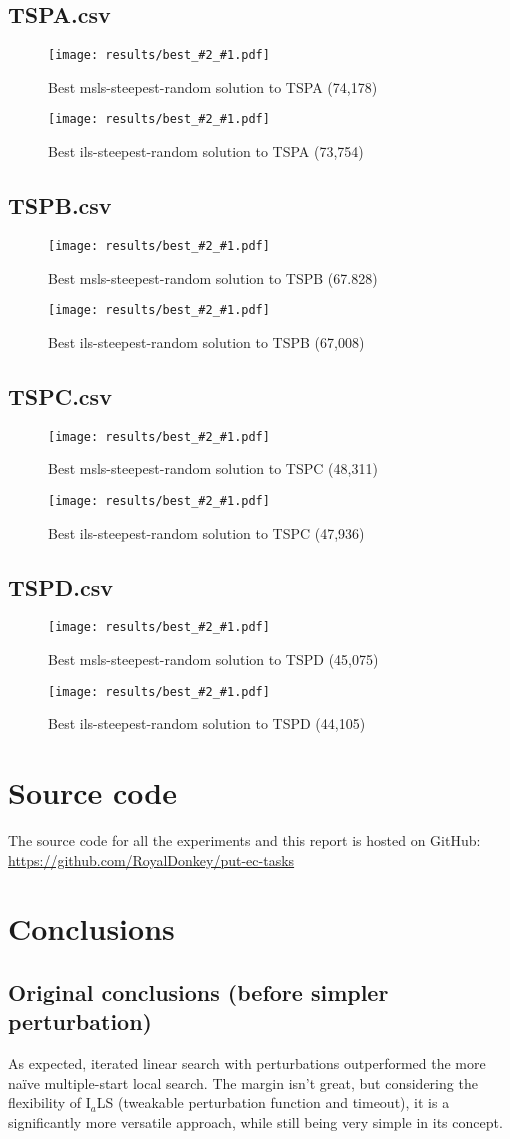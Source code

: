 \documentclass[14pt]{article}
\begin{document}
\newcommand{\visualization}[3]{%
\begin{figure}[H]%
	\texttt{[image: results/best\_\#2\_\#1.pdf]}%
	\vspace{-12mm}%
	\caption{Best #2 solution to #1 (#3)}%
\end{figure}%
}

\subsection{TSPA.csv}
\visualization{TSPA}{msls-steepest-random}{74,178}
\visualization{TSPA}{ils-steepest-random}{73,754}

\subsection{TSPB.csv}
\visualization{TSPB}{msls-steepest-random}{67.828}
\visualization{TSPB}{ils-steepest-random}{67,008}

\subsection{TSPC.csv}
\visualization{TSPC}{msls-steepest-random}{48,311}
\visualization{TSPC}{ils-steepest-random}{47,936}

\subsection{TSPD.csv}
\visualization{TSPD}{msls-steepest-random}{45,075}
\visualization{TSPD}{ils-steepest-random}{44,105}

\section{Source code}
The source code for all the experiments and this report is hosted on GitHub: \\
\url{https://github.com/RoyalDonkey/put-ec-tasks}

\section{Conclusions}
\subsection{Original conclusions (before simpler perturbation)}
As expected, iterated linear search with perturbations outperformed the more
naïve multiple-start local search. The margin isn't great, but considering
the flexibility of I$_a$LS (tweakable perturbation function and timeout), it is a
significantly more versatile approach, while still being very simple in its
concept.
\end{document}
